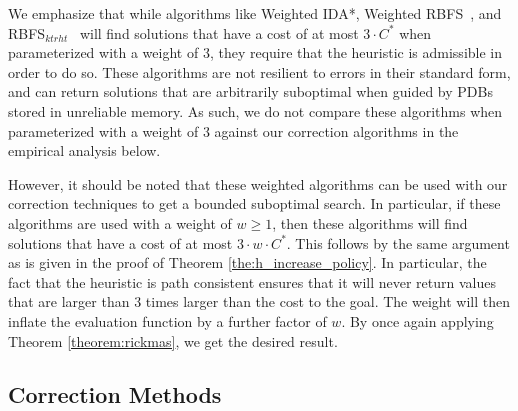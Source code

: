 \documentclass[letterpaper]{article}
\begin{document}
We emphasize that while algorithms like Weighted IDA*, Weighted RBFS~\cite{Korf1992}, and RBFS$_{ktrht}$~\cite{hatem2015recursive} will find solutions that have a cost of at most $3 \cdot C^*$ when parameterized with a weight of $3$, they require that the heuristic is admissible in order to do so. These algorithms are not resilient to errors in their standard form, and can return solutions that are arbitrarily suboptimal when guided by PDBs stored in unreliable memory. As such, we do not compare these algorithms when parameterized with a weight of $3$ against our correction algorithms in the empirical analysis below.

However, it should be noted that these weighted algorithms can be used with our correction techniques to get a bounded suboptimal search. In particular, if these algorithms are used with a weight of $w \geq 1$, then these algorithms will find solutions that have a cost of at most  $3 \cdot w \cdot C^*$. This follows by the same argument as is given in the proof of Theorem \ref{the:h_increase_policy}. In particular, the fact that the heuristic is path consistent ensures that it will never return values that are larger than $3$ times larger than the cost to the goal. The weight will then inflate the evaluation function by a further factor of $w$. By once again applying Theorem \ref{theorem:rickmas}, we get the desired result.









\subsection{Correction Methods}



\end{document}

